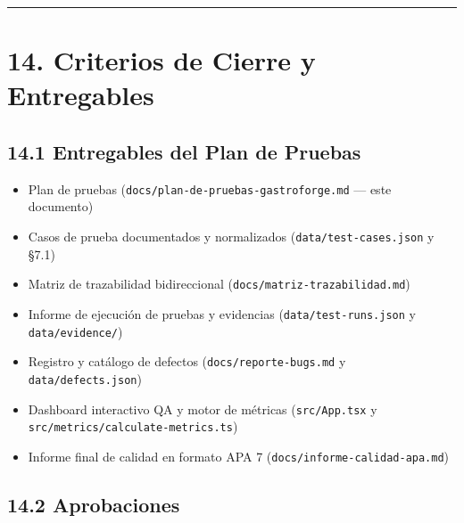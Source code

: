 \documentclass[10pt,a4paper]{article}
\providecommand{\tightlist}{\setlength{\itemsep}{0pt}\setlength{\parskip}{0pt}}
\begin{document}
\endgroup\medskip

\begin{center}\rule{0.5\linewidth}{0.5pt}\end{center}


\section{14. Criterios de Cierre y Entregables}\label{14-criterios-de-cierre-y-entregables}


\subsection{14.1 Entregables del Plan de Pruebas}\label{141-entregables-del-plan-de-pruebas}

\begin{itemize}
\tightlist
\item
  Plan de pruebas (\texttt{docs/\allowbreak{}plan-{}\allowbreak{}de-{}\allowbreak{}pruebas-{}\allowbreak{}gastroforge.\allowbreak{}md} --- este documento)
\item
  Casos de prueba documentados y normalizados (\texttt{data/\allowbreak{}test-{}\allowbreak{}cases.\allowbreak{}json} y §7.1)
\item
  Matriz de trazabilidad bidireccional (\texttt{docs/\allowbreak{}matriz-{}\allowbreak{}trazabilidad.\allowbreak{}md})
\item
  Informe de ejecución de pruebas y evidencias (\texttt{data/\allowbreak{}test-{}\allowbreak{}runs.\allowbreak{}json} y \texttt{data/\allowbreak{}evidence/\allowbreak{}})
\item
  Registro y catálogo de defectos (\texttt{docs/\allowbreak{}reporte-{}\allowbreak{}bugs.\allowbreak{}md} y \texttt{data/\allowbreak{}defects.\allowbreak{}json})
\item
  Dashboard interactivo QA y motor de métricas (\texttt{src/\allowbreak{}App.\allowbreak{}tsx} y \texttt{src/\allowbreak{}metrics/\allowbreak{}calculate-{}\allowbreak{}metrics.\allowbreak{}ts})
\item
  Informe final de calidad en formato APA 7 (\texttt{docs/\allowbreak{}informe-{}\allowbreak{}calidad-{}\allowbreak{}apa.\allowbreak{}md})
\end{itemize}


\subsection{14.2 Aprobaciones}\label{142-aprobaciones}
\end{document}
